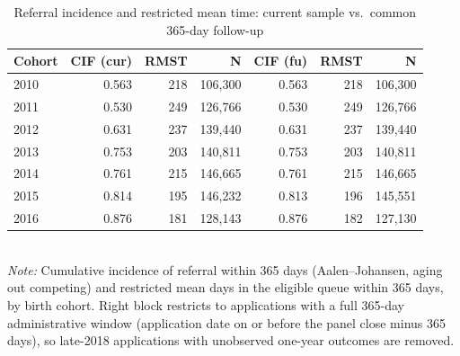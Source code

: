 \begin{table}[htbp]\centering
\caption{Referral incidence and restricted mean time: current sample vs.\ common 365-day follow-up}
\label{tab:P2fu}
\footnotesize
\setlength{\tabcolsep}{4pt}
\begin{tabular}{lrrrrrr}
\toprule
Cohort & CIF (cur) & RMST & N & CIF (fu) & RMST & N \\
\midrule
2010 & 0.563 & 218 & 106,300 & 0.563 & 218 & 106,300 \\
2011 & 0.530 & 249 & 126,766 & 0.530 & 249 & 126,766 \\
2012 & 0.631 & 237 & 139,440 & 0.631 & 237 & 139,440 \\
2013 & 0.753 & 203 & 140,811 & 0.753 & 203 & 140,811 \\
2014 & 0.761 & 215 & 146,665 & 0.761 & 215 & 146,665 \\
2015 & 0.814 & 195 & 146,232 & 0.813 & 196 & 145,551 \\
2016 & 0.876 & 181 & 128,143 & 0.876 & 182 & 127,130 \\
\bottomrule
\end{tabular}
\\[3pt]{\footnotesize \textit{Note:} Cumulative incidence of referral within 365 days (Aalen--Johansen, aging out competing) and restricted mean days in the eligible queue within 365 days, by birth cohort. Right block restricts to applications with a full 365-day administrative window (application date on or before the panel close minus 365 days), so late-2018 applications with unobserved one-year outcomes are removed.}
\end{table}
